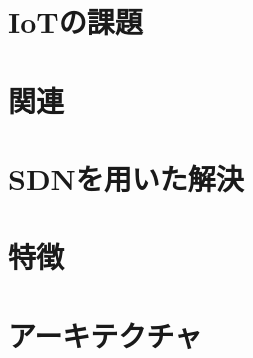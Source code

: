 \documentclass{jsarticle}
\begin{document}
\section{IoTの課題}

\section{関連}

\section{SDNを用いた解決}

\section{特徴}

\section{アーキテクチャ}
\end{document}
